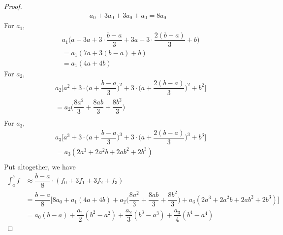 \documentclass[10pt,letterpaper]{article}
\begin{document}
\begin{proof}
\begin{align*}
	a_0 + 3a_0 + 3a_0 + a_0 = 8a_0
\end{align*}
	For $a_1$,
\begin{align*}
	& a_1\bigg(a + 3a + 3 \cdot \dfrac{b-a}{3} + 3a + 3 \cdot \dfrac{2(b-a)}{3} + b\bigg)\\
&= a_1(7a + 3(b-a) + b) \\
&= a_1(4a + 4b) 
\end{align*}
	For $a_2$,
	\begin{align*}
& a_2\bigg[a^2 +  3 \cdot \bigg(a +\dfrac{b-a}{3}\bigg)^2 + 3 \cdot \bigg(a + \dfrac{2(b-a)}{3}\bigg)^2 + b^2\bigg]\\
&= a_2\bigg( \dfrac{8a^2}{3} + \dfrac{8ab}{3} + \dfrac{8b^2}{3} \bigg) \\
	\end{align*}
	For $a_3$,
\begin{align*}
& a_3\bigg[a^3 +  3 \cdot \bigg(a +\dfrac{b-a}{3}\bigg)^3 + 3 \cdot \bigg(a + \dfrac{2(b-a)}{3}\bigg)^3 + b^3\bigg]\\
&= a_3(2a^3 + 2a^2b + 2ab^2 + 2b^3) \\
	\end{align*}
 	Put altogether, we have
\begin{align*}
	\displaystyle\int_a^b f &\approx \dfrac{b - a}{8} \cdot (f_0 + 3f_1 + 3f_2 + f_3) \\
&= \dfrac{b-a}{8}\bigg[ 8a_0 + a_1(4a + 4b) + a_2\bigg( \dfrac{8a^2}{3} + \dfrac{8ab}{3} + \dfrac{8b^2}{3} \bigg)
+ a_3(2a^3 + 2a^2b + 2ab^2 + 2b^3)] \\
&= a_0(b - a) + \dfrac{a_1}{2}(b^2 - a^2) + 
\dfrac{a_2}{3}(b^3 - a^3) + 
\dfrac{a_3}{4}(b^4 - a^4)
\end{align*}	 	

\end{proof}
	
\end{document}
